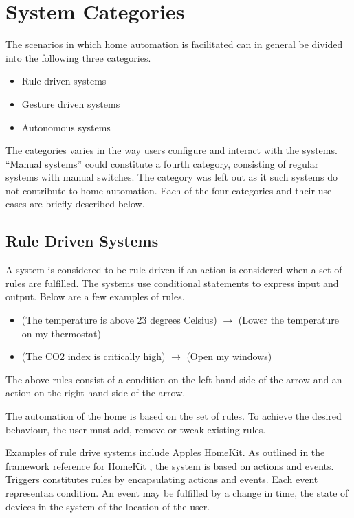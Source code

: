 \section{System Categories}\label{sec:system-categories}

The scenarios in which home automation is facilitated can in general be divided into the following three categories.

\begin{itemize}
\item Rule driven systems
\item Gesture driven systems
\item Autonomous systems
\end{itemize}

The categories varies in the way users configure and interact with the systems. 
``Manual systems'' could constitute a fourth category, consisting of regular systems with manual switches. 
The category was left out as it such systems do not contribute to home automation.
Each of the four categories and their use cases are briefly described below.

\subsection{Rule Driven Systems}

A system is considered to be rule driven if an action is considered when a set of rules are  fulfilled. 
The systems use conditional statements to express input and output. Below are a few examples of rules.

\begin{itemize}
\item (The temperature is above 23 degrees Celsius) $\rightarrow$ (Lower the temperature on my thermostat)
\item (The CO2 index is critically high) $\rightarrow$ (Open my windows)
\end{itemize}

The above rules consist of a condition on the left-hand side of the arrow and an action on the right-hand side of the arrow.

The automation of the home is based on the set of rules. 
To achieve the desired behaviour, the user must add, remove or tweak existing rules.

Examples of rule drive systems include Apples HomeKit. 
As outlined in the framework reference for HomeKit \cite{applehomekitref}, the system is based on actions and events. 
Triggers constitutes rules by encapsulating actions and events. 
Each event representaa condition. An event may be fulfilled by a change in time, the state of devices in the system of the location of the user.

